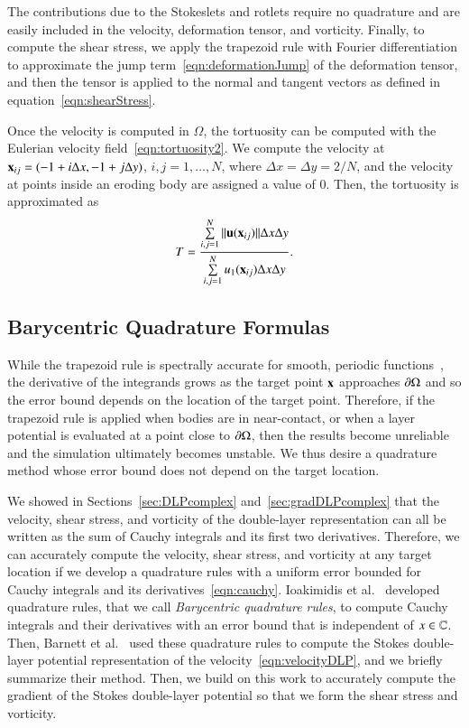 \documentclass[preprint,10pt]{elsarticle}
\begin{document}
The contributions due to the Stokeslets and rotlets require no
quadrature and are easily included in the velocity, deformation tensor,
and vorticity.  Finally, to compute the shear stress, we apply the
trapezoid rule with Fourier differentiation to approximate the jump
term~\eqref{eqn:deformationJump} of the deformation tensor, and then the
tensor is applied to the normal and tangent vectors as defined in
equation~\eqref{eqn:shearStress}.

Once the velocity is computed in $\Omega$, the tortuosity can be
computed with the Eulerian velocity field~\eqref{eqn:tortuosity2}.  We
compute the velocity at ${\mathbf{x}}_{ij} = (-1 + i\Delta x, -1 + j\Delta y)$,
$i,j=1,\ldots,N$, where $\Delta x = \Delta y = 2/N$, and the velocity at
points inside an eroding body are assigned a value of 0.  Then, the
tortuosity is approximated as
\begin{align}
  T = \frac{\sum\limits_{i,j=1}^N \|{\mathbf{u}}({\mathbf{x}}_{ij})\|\Delta x \Delta y}
      {\sum\limits_{i,j=1}^N u_1({\mathbf{x}}_{ij}) \Delta x \Delta y}.
\end{align}

\subsection{Barycentric Quadrature Formulas}
\label{sec:bary}
While the trapezoid rule is spectrally accurate for smooth, periodic
functions~\cite{tre-wei2014}, the derivative of the integrands grows as
the target point ${\mathbf{x}}$ approaches ${\partial}\Omega$ and so the error bound
depends on the location of the target point. Therefore, if the trapezoid
rule is applied when bodies are in near-contact, or when a layer
potential is evaluated at a point close to ${\partial}\Omega$, then the results
become unreliable and the simulation ultimately becomes unstable.  We
thus desire a quadrature method whose error bound does not depend on the
target location.

We showed in Sections~\ref{sec:DLPcomplex} and~\ref{sec:gradDLPcomplex}
that the velocity, shear stress, and vorticity of the double-layer
representation can all be written as the sum of Cauchy integrals and its
first two derivatives.  Therefore, we can accurately compute the
velocity, shear stress, and vorticity at any target location if we
develop a quadrature rules with a uniform error bounded for Cauchy
integrals and its derivatives~\eqref{eqn:cauchy}.  Ioakimidis et
al.~\cite{ioa-pap-per1991} developed quadrature rules, that we call {\em
Barycentric quadrature rules}, to compute Cauchy integrals and their
derivatives with an error bound that is independent of $x \in {\mathbb{C}}$.
Then, Barnett et al.~\cite{bar-wu-vee2015} used these quadrature rules
to compute the Stokes double-layer potential representation of the
velocity~\eqref{eqn:velocityDLP}, and we briefly summarize their method.
Then, we build on this work to accurately compute the gradient of the
Stokes double-layer potential so that we form the shear stress and
vorticity.
\end{document}
